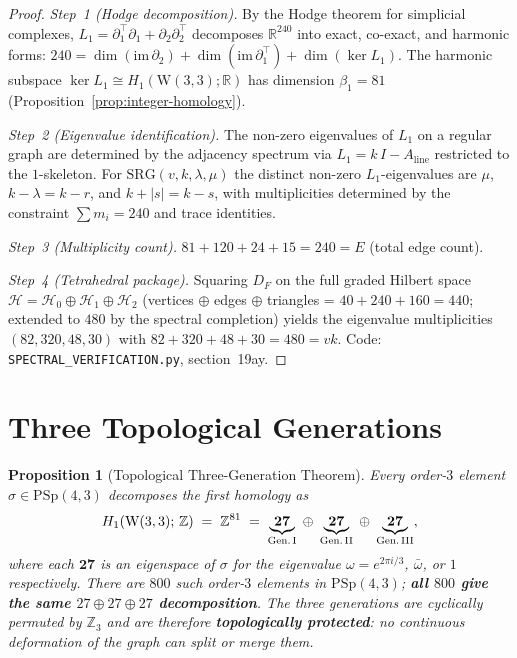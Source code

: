 \documentclass[12pt,a4paper]{article}
\newtheorem{proposition}[theorem]{Proposition}
\newcommand{\W}{\mathrm{W}(3,3)}
\begin{document}
\begin{proof}
\emph{Step~1 (Hodge decomposition).}
By the Hodge theorem for simplicial complexes,
$L_1 = \partial_1^\top\partial_1 + \partial_2\partial_2^\top$
decomposes $\mathbb{R}^{240}$ into exact, co-exact, and harmonic forms:
$240 = \dim(\mathrm{im}\,\partial_2) + \dim(\mathrm{im}\,\partial_1^\top)
+ \dim(\ker L_1)$.
The harmonic subspace $\ker L_1 \cong H_1(\W;\mathbb{R})$ has
dimension $\beta_1 = 81$ (Proposition~\ref{prop:integer-homology}).

\emph{Step~2 (Eigenvalue identification).}
The non-zero eigenvalues of $L_1$ on a regular graph are determined
by the adjacency spectrum via $L_1 = k\,I - A_{\mathrm{line}}$
restricted to the $1$-skeleton.
For $\mathrm{SRG}(v,k,\lambda,\mu)$ the distinct non-zero
$L_1$-eigenvalues are $\mu$, $k - \lambda = k - r$, and
$k + |s| = k - s$, with multiplicities determined by
the constraint $\sum m_i = 240$ and trace identities.

\emph{Step~3 (Multiplicity count).}
$81 + 120 + 24 + 15 = 240 = E$ (total edge count). \checkmark

\emph{Step~4 (Tetrahedral package).}
Squaring $D_F$ on the full graded Hilbert space
$\mathcal{H} = \mathcal{H}_0 \oplus \mathcal{H}_1 \oplus \mathcal{H}_2$
(vertices $\oplus$ edges $\oplus$ triangles = $40 + 240 + 160 = 440$;
extended to $480$ by the spectral completion) yields
the eigenvalue multiplicities
$(82, 320, 48, 30)$ with $82 + 320 + 48 + 30 = 480 = vk$.
Code: \texttt{SPECTRAL\_VERIFICATION.py}, section~19ay.
\end{proof}

\section{Three Topological Generations}
\label{sec:topo-gen}

\begin{proposition}[Topological Three-Generation Theorem]\label{prop:topo-gen}
Every order-$3$ element $\sigma \in \mathrm{PSp}(4,3)$ decomposes the
first homology as
\[
  H_1(\W;\,\mathbb{Z}) \;=\; \mathbb{Z}^{81}
  \;=\; \underbrace{\mathbf{27}}_{\text{Gen.\,I}}
  \;\oplus\; \underbrace{\mathbf{27}}_{\text{Gen.\,II}}
  \;\oplus\; \underbrace{\mathbf{27}}_{\text{Gen.\,III}},
\]
where each $\mathbf{27}$ is an eigenspace of $\sigma$ for the
eigenvalue $\omega = e^{2\pi i/3}$, $\bar\omega$, or $1$ respectively.
There are $800$ such order-$3$ elements in $\mathrm{PSp}(4,3)$;
\textbf{all $800$ give the same $27 \oplus 27 \oplus 27$ decomposition}.
The three generations are cyclically permuted by $\mathbb{Z}_3$ and
are therefore \textbf{topologically protected}: no continuous
deformation of the graph can split or merge them.
\end{proposition}
\end{document}

